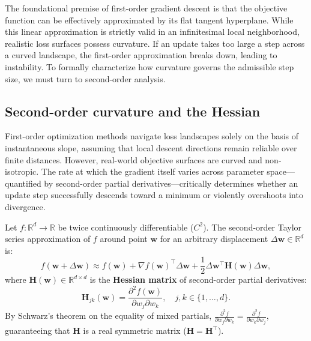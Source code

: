 The foundational premise of first-order gradient descent is that the objective function can be effectively approximated by its flat tangent hyperplane. While this linear approximation is strictly valid in an infinitesimal local neighborhood, realistic loss surfaces possess curvature. If an update takes too large a step across a curved landscape, the first-order approximation breaks down, leading to instability. To formally characterize how curvature governs the admissible step size, we must turn to second-order analysis.

\subsection{Second-order curvature and the Hessian}
\label{sec:second_order_curvature}
\label{sec:hessian_matrix}
\label{sec:condition_number_ravines}

First-order optimization methods navigate loss landscapes solely on the basis of instantaneous slope, assuming that local descent directions remain reliable over finite distances. However, real-world objective surfaces are curved and non-isotropic. The rate at which the gradient itself varies across parameter space---quantified by second-order partial derivatives---critically determines whether an update step successfully descends toward a minimum or violently overshoots into divergence.

Let $f: \mathbb{R}^d \to \mathbb{R}$ be twice continuously differentiable ($C^2$). The second-order Taylor series approximation of $f$ around point $\mathbf{w}$ for an arbitrary displacement $\Delta \mathbf{w} \in \mathbb{R}^d$ is:
\begin{equation}
f(\mathbf{w} + \Delta \mathbf{w}) \approx f(\mathbf{w}) + \nabla f(\mathbf{w})^\top \Delta \mathbf{w} + \frac{1}{2} \Delta \mathbf{w}^\top \mathbf{H}(\mathbf{w}) \Delta \mathbf{w},
\label{eq:second_order_taylor}
\end{equation}
where $\mathbf{H}(\mathbf{w}) \in \mathbb{R}^{d \times d}$ is the \textbf{Hessian matrix} of second-order partial derivatives:
\begin{equation}
\mathbf{H}_{jk}(\mathbf{w}) = \frac{\partial^2 f(\mathbf{w})}{\partial w_j \partial w_k}, \quad j, k \in \{1, \dots, d\}.
\label{eq:hessian_def}
\end{equation}
By Schwarz's theorem on the equality of mixed partials, $\frac{\partial^2 f}{\partial w_j \partial w_k} = \frac{\partial^2 f}{\partial w_k \partial w_j}$, guaranteeing that $\mathbf{H}$ is a real symmetric matrix ($\mathbf{H} = \mathbf{H}^\top$).

